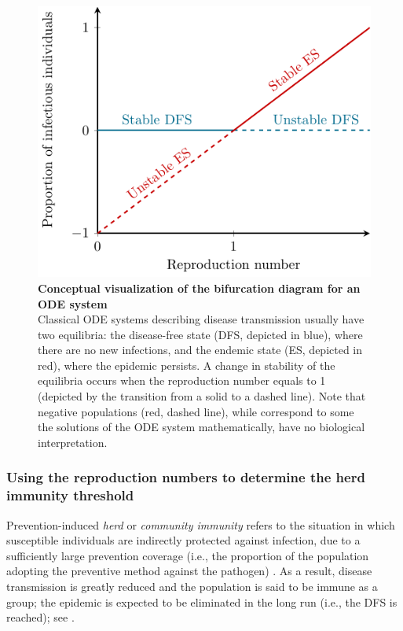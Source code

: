 \begin{figure}[H]
	\centering	
	\includegraphics{Figures/Intro/TikZ_Bifurcation/TranscriticalBifurcation}
	\caption[ Conceptual visualization of the bifurcation diagram for an ODE system]{%
		{\bf Conceptual visualization of the bifurcation diagram for an ODE system}\\
	Classical ODE systems describing disease transmission usually have two equilibria: the disease-free state (DFS, depicted in blue), where there are no new infections, and the endemic state (ES, depicted in red), where the epidemic persists. A change in stability of the equilibria occurs when the reproduction number equals to 1 (depicted by the transition from a solid to a dashed line). Note that negative populations (red, dashed line), while correspond to some the solutions of the ODE system mathematically, have no biological interpretation.}
	\label{fig:Intro_Bifurcation}
\end{figure}

\subsubsection{Using the reproduction numbers to determine the herd immunity threshold} 
\label{sec:Intro_HerdImmunity}

Prevention-induced \textit{herd} or \textit{community immunity} refers to the situation in which susceptible individuals are indirectly protected against infection, due to a sufficiently large prevention coverage (i.e., the proportion of the population adopting the preventive method against the pathogen) \cite[]{Porta2014}. As a result, disease transmission is greatly reduced and the population is said to be immune as a group; the epidemic is expected to be eliminated in the long run (i.e., the DFS is reached); see \cite[]{Fine2011}.

